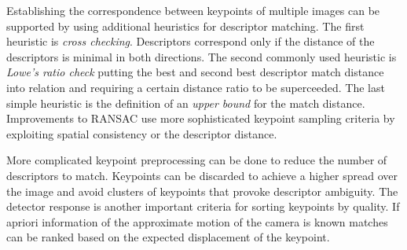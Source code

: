 Establishing the correspondence between keypoints of multiple images can be supported by using additional heuristics for descriptor matching.
The first heuristic is \emph{cross checking}.
Descriptors correspond only if the distance of the descriptors is minimal in both directions.
The second commonly used heuristic is \emph{Lowe's ratio check}\cite{lowe_ijcv04} putting the best and second best descriptor match distance into relation and requiring a certain distance ratio to be superceeded.
The last simple heuristic is the definition of an \emph{upper bound} for the match distance.
Improvements to \acrshort{RANSAC}\cite{sattler_iccv2009,chum_cvpr2005} use more sophisticated keypoint sampling criteria by exploiting spatial consistency or the descriptor distance.

More complicated keypoint preprocessing can be done to reduce the number of descriptors to match.
Keypoints can be discarded to achieve a higher spread over the image and avoid clusters of keypoints that provoke descriptor ambiguity.
The detector response is another important criteria for sorting keypoints by quality.
If apriori information of the approximate motion of the camera is known matches can be ranked based on the expected displacement of the keypoint.

